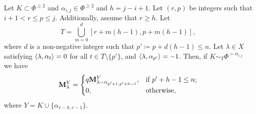 \begin{lemma}\rm\label{lem: right solving}
Let $K \subset \Phi^{\geq 2}$ and $\alpha_{i,j} \in \Phi^{\geq 2}$ and $h = j - i + 1$.
Let $(r,p)$ be integers  such that  $i + 1 < r \leq p  \leq j$.
Additionally, assume that $r\geq h$.
Let $$T =  \bigcup_{m = 0}^{d} [r + m(h - 1), p + m(h - 1)],$$
where  $d$ is a non-negative integer such that $p'\coloneqq p + d(h - 1) \leq n$.
Let $\lambda \in X$ satisfying $\langle \lambda , \alpha_t \rangle = 0$ for all $t \in T \setminus \{p'\}$, and $\langle \lambda , \alpha_{p'} \rangle = -1$.
Then, if  $K \sim_{T} \Phi^{\succ \alpha_{i,j}}$ we have
\begin{equation}  \label{eq: M element with a -1 in p'}
    \mathbf{M}_{\lambda}^{Y} = 
\begin{cases} 
q \mathbf{M}_{\lambda - \alpha_{{p'} + 1, {p'} + h - 1}}^{Y}, & \text{if } {p'} + h - 1 \leq n; \\
0, & \text{otherwise},
\end{cases}
\end{equation}
where $Y = K \cup \{\alpha_{r - h, r - 1}\}$.
\end{lemma}

